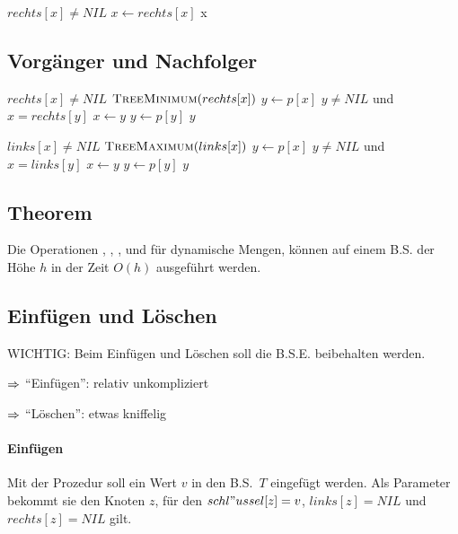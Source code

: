 \documentclass[a4paper]{scrartcl}
\begin{document}
\begin{codebox}
\li \While $rechts[x] \neq NIL$
\li 	\Do $x \gets rechts[x]$
		\End
\li	\Return x
\end{codebox}

\subsection{Vorgänger und Nachfolger}
\begin{codebox}
\li	\If $rechts[x] \neq NIL$
\li		\Then \Return $\textnormal{\scshape TreeMinimum}(rechts[x])$
		\End
\li $y \gets p[x]$
\li \While $y \neq NIL$ und $x=rechts[y]$
\li		\Do $x \gets y$
\li				$y \gets p[y]$
		\End
\li \Return $y$
\end{codebox}

\begin{codebox}
\li	\If $links[x] \neq NIL$
\li		\Then \Return $\textnormal{\scshape TreeMaximum}(links[x])$
		\End
\li $y \gets p[x]$
\li \While $y \neq NIL$ und $x=links[y]$
\li		\Do $x \gets y$
\li				$y \gets p[y]$
		\End
\li \Return $y$
\end{codebox}

\subsection{Theorem}
Die Operationen , , ,  und 
 für dynamische Mengen, können auf einem B.S. der Höhe $h$
in der Zeit $O(h)$ ausgeführt werden.

\subsection{Einfügen und Löschen}
WICHTIG: Beim Einfügen und Löschen soll die B.S.E. beibehalten werden.
\begin{description}
\item{$\Rightarrow$} "`Einfügen"': relativ unkompliziert
\item{$\Rightarrow$} "`Löschen"': etwas kniffelig
\end{description}

\paragraph{Einfügen}

Mit der Prozedur  soll ein Wert $v$ in den B.S.\ $T$ eingefügt werden. Als Parameter bekommt sie
den Knoten $z$, für den $schl"ussel[z] = v$, $links[z]=NIL$ und $rechts[z]=NIL$ gilt.
\end{document}
